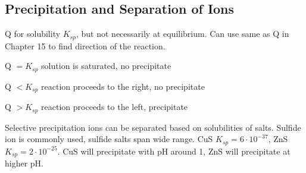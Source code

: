 \begin{mdframed}
\begin{multicols}{2}
\subsection{Precipitation and Separation of Ions}
\begin{compactdesc}
\item[Q for solubility] $K_{sp}$, but not necessarily at equilibrium.
Can use same as Q in Chapter 15 to find direction of the reaction.
\item[Q $= K_{sp}$] solution is saturated, no precipitate
\item[Q $< K_{sp}$] reaction proceeds to the right, no precipitate
\item[Q $> K_{sp}$] reaction proceeds to the left, precipitate
\item[Selective precipitation] ions can be separated based on solubilities of
    salts. Sulfide ion is commonly used, sulfide salts span wide range.
    CuS $K_{sp} = 6\cdot 10^{-37}$, ZnS $K_{sp} = 2\cdot 10^{-25}$.
    CuS will precipitate with pH around 1, ZnS will precipitate at higher
    pH.
\end{compactdesc}
\end{multicols}
\end{mdframed}






